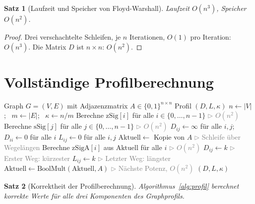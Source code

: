 ﻿\documentclass[a4paper,12pt,openany,oneside]{book}
\renewcommand{\algorithmiccomment}[1]{\hfill\textcolor{gray}{$\triangleright$ #1}}
\theoremstyle{definition}
\theoremstyle{plain}
\newtheorem{satz}{Satz}[chapter]
\theoremstyle{remark}
\begin{document}
\begin{satz}[Laufzeit und Speicher von Floyd-Warshall]
  Laufzeit $O(n^3)$, Speicher $O(n^2)$.
\end{satz}

\begin{proof}
  Drei verschachtelte Schleifen, je $n$ Iterationen, $O(1)$ pro Iteration:
  $O(n^3)$. Die Matrix $D$ ist $n \times n$: $O(n^2)$.
\end{proof}

\section{Vollst\"andige Profilberechnung}

\begin{algorithm}[H]
  \caption{Vollst\"andige Profilberechnung}
  \label{alg:profil}
  \begin{algorithmic}[1]
    \Require Graph $G=(V,E)$ mit Adjazenzmatrix $A \in \{0,1\}^{n\times n}$
    \Ensure Profil $(D, L, \kappa)$
    \State $n \gets |V|$;~ $m \gets |E|$;~ $\kappa \gets n/m$
    \State Berechne $\mathrm{zSig}[i]$ f\"ur alle $i \in \{0,\ldots,n-1\}$
           \algorithmiccomment{$O(n^2)$}
    \State Berechne $\mathrm{sSig}[j]$ f\"ur alle $j \in \{0,\ldots,n-1\}$
           \algorithmiccomment{$O(n^2)$}
    \State $D_{ij} \gets \infty$ f\"ur alle $i,j$;~
           $D_{ii} \gets 0$ f\"ur alle $i$
    \State $L_{ij} \gets 0$ f\"ur alle $i,j$
    \State $\mathrm{Aktuell} \gets$ Kopie von $A$
           \algorithmiccomment{Schleife \"uber Wegel\"angen}
      \State Berechne $\mathrm{zSigA}[i]$ aus $\mathrm{Aktuell}$
             f\"ur alle $i$ \algorithmiccomment{$O(n^2)$}
              \State $D_{ij} \gets k$
                     \algorithmiccomment{Erster Weg: k\"urzester}
            \EndIf
            \State $L_{ij} \gets k$
                   \algorithmiccomment{Letzter Weg: l\"angster}
          \EndIf
        \EndFor
      \EndFor
      \State $\mathrm{Aktuell} \gets
             \mathrm{BoolMult}(\mathrm{Aktuell}, A)$
             \algorithmiccomment{N\"achste Potenz, $O(n^2)$}
    \EndFor
    \State \Return $(D, L, \kappa)$
  \end{algorithmic}
\end{algorithm}

\begin{satz}[Korrektheit der Profilberechnung]
  Algorithmus~\ref{alg:profil} berechnet korrekte Werte f\"ur alle drei
  Komponenten des Graphprofils.
\end{satz}
\end{document}
